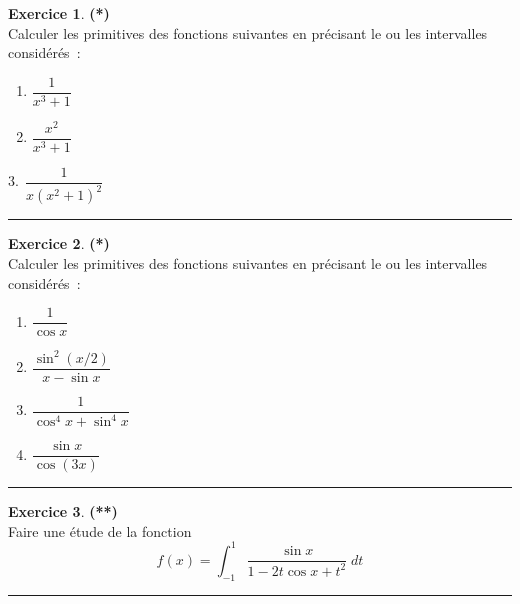 \documentclass[a4paper,11pt]{article}
\theoremstyle{definition}
\newtheorem{exo}{Exercice} %
\begin{document}
   
\begin{minipage}{1\linewidth}\begin{minipage}[t]{0.48\linewidth}\raggedright
	
\begin{exo}\textbf{(*)}\quad\\[0.2cm]
Calculer les primitives des fonctions suivantes en précisant le ou les intervalles considérés~:

\begin{multicols}{2}
\begin{enumerate}
\item $\dfrac{1}{x^3+1}$
\item $\dfrac{x^2}{x^3+1}$
\end{enumerate}
\end{multicols}
\quad \quad \quad \quad \quad \quad \quad $3. \ \ \dfrac{1}{x(x^2+1)^2}$\vspace{0.25cm}
	
\centering\rule{1\linewidth}{0.6pt}\end{exo}



\begin{exo}\textbf{(*)}\quad\\[0.2cm]
	Calculer les primitives des fonctions suivantes en précisant le ou les intervalles considérés~:

	
	\begin{multicols}{2}
		\begin{enumerate}
			\item $\dfrac{1}{\cos x}$
			\item $\dfrac{\sin^2(x/2)}{x-\sin x}$
			\item $\dfrac{1}{\cos^4x+\sin^4x}$
			\item $\dfrac{\sin x}{\cos(3x)}$
		\end{enumerate}
	\end{multicols}

	\centering\rule{1\linewidth}{0.6pt}\end{exo}

\begin{exo}\textbf{(**)}\quad\\[0.2cm]
	Faire une étude de la fonction $$f(x)=\int_{-1}^{1}\frac{\sin x}{1-2t\cos x+t^2}\;dt$$ 
	\centering\rule{1\linewidth}{0.6pt}\end{exo}



\end{minipage}\hfill\vrule\hfill\begin{minipage}[t]{0.48\linewidth}\raggedright


\end{minipage}
\end{minipage}
\end{document}
